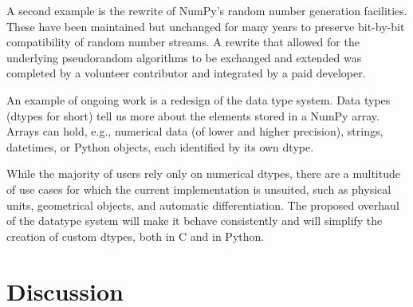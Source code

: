 A second example is the rewrite of NumPy's random number generation facilities.
These have been maintained but unchanged for many years to preserve bit-by-bit
compatibility of random number streams.  A rewrite that allowed for the
underlying pseudorandom algorithms to be exchanged and extended was completed
by a volunteer contributor and integrated by a paid developer.

An example of ongoing work is a redesign of the data type system.  Data types
(dtypes for short) tell us more about the elements stored in a NumPy array.
Arrays can hold, e.g., numerical data (of lower and higher precision), strings,
datetimes, or Python objects, each identified by its own dtype.

While the majority of users rely only on numerical dtypes,
there are a multitude of use cases for which the current implementation is unsuited, such as physical units\cite{astropy,Goldbaum2018,pint},
geometrical objects\cite{pygeos}, and automatic
differentiation\cite{pyadolc}.
The proposed overhaul of the datatype system will make it behave consistently and will simplify the creation of custom dtypes, both in C and in Python.

\section*{Discussion}


